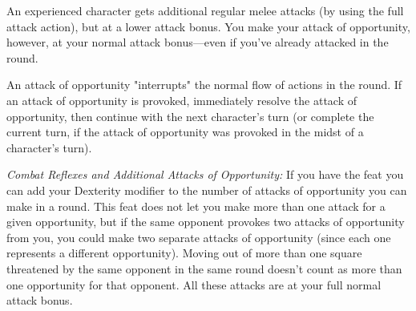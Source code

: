An experienced character gets additional regular melee attacks (by using the full attack action), but at a lower attack bonus. You make your attack of opportunity, however, at your normal attack bonus---even if you've already attacked in the round.

An attack of opportunity "interrupts" the normal flow of actions in the round. If an attack of opportunity is provoked, immediately resolve the attack of opportunity, then continue with the next character's turn (or complete the current turn, if the attack of opportunity was provoked in the midst of a character's turn).

\textit{Combat Reflexes and Additional Attacks of Opportunity:} If you have the  feat you can add your Dexterity modifier to the number of attacks of opportunity you can make in a round. This feat does not let you make more than one attack for a given opportunity, but if the same opponent provokes two attacks of opportunity from you, you could make two separate attacks of opportunity (since each one represents a different opportunity). Moving out of more than one square threatened by the same opponent in the same round doesn't count as more than one opportunity for that opponent. All these attacks are at your full normal attack bonus.